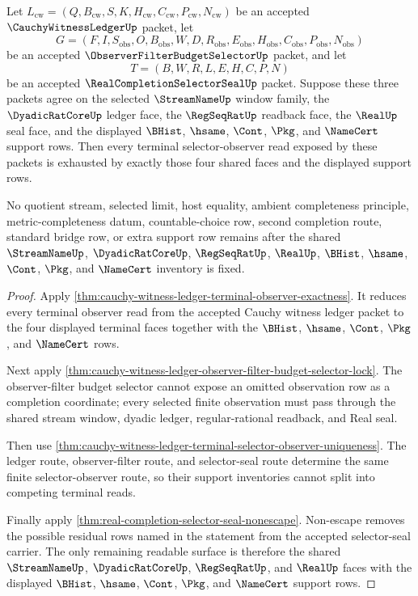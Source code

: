 \begin{theorem}
\label{thm:cauchy-witness-ledger-terminal-selector-observer-support-exhaustion}
Let $L_{\mathrm{cw}}=(Q,B_{\mathrm{cw}},S,K,H_{\mathrm{cw}},C_{\mathrm{cw}},P_{\mathrm{cw}},N_{\mathrm{cw}})$ be an accepted $\CauchyWitnessLedgerUp$ packet, let
$$
G=(F,I,S_{\mathrm{obs}},O,B_{\mathrm{obs}},W,D,R_{\mathrm{obs}},E_{\mathrm{obs}},H_{\mathrm{obs}},C_{\mathrm{obs}},P_{\mathrm{obs}},N_{\mathrm{obs}})
$$
be an accepted $\ObserverFilterBudgetSelectorUp$ packet, and let
$$
T=(B,W,R,L,E,H,C,P,N)
$$
be an accepted $\RealCompletionSelectorSealUp$ packet. Suppose these three packets agree on the selected $\StreamNameUp$ window family, the $\DyadicRatCoreUp$ ledger face, the $\RegSeqRatUp$ readback face, the $\RealUp$ seal face, and the displayed $\BHist$, $\hsame$, $\Cont$, $\Pkg$, and $\NameCert$ support rows. Then every terminal selector-observer read exposed by these packets is exhausted by exactly those four shared faces and the displayed support rows.

No quotient stream, selected limit, host equality, ambient completeness principle, metric-completeness datum, countable-choice row, second completion route, standard bridge row, or extra support row remains after the shared $\StreamNameUp$, $\DyadicRatCoreUp$, $\RegSeqRatUp$, $\RealUp$, $\BHist$, $\hsame$, $\Cont$, $\Pkg$, and $\NameCert$ inventory is fixed.
\end{theorem}
\begin{proof}
Apply \autoref{thm:cauchy-witness-ledger-terminal-observer-exactness}. It reduces every terminal observer read from the accepted Cauchy witness ledger packet to the four displayed terminal faces together with the $\BHist$, $\hsame$, $\Cont$, $\Pkg$, and $\NameCert$ rows.

Next apply \autoref{thm:cauchy-witness-ledger-observer-filter-budget-selector-lock}. The observer-filter budget selector cannot expose an omitted observation row as a completion coordinate; every selected finite observation must pass through the shared stream window, dyadic ledger, regular-rational readback, and Real seal.

Then use \autoref{thm:cauchy-witness-ledger-terminal-selector-observer-uniqueness}. The ledger route, observer-filter route, and selector-seal route determine the same finite selector-observer route, so their support inventories cannot split into competing terminal reads.

Finally apply \autoref{thm:real-completion-selector-seal-nonescape}. Non-escape removes the possible residual rows named in the statement from the accepted selector-seal carrier. The only remaining readable surface is therefore the shared $\StreamNameUp$, $\DyadicRatCoreUp$, $\RegSeqRatUp$, and $\RealUp$ faces with the displayed $\BHist$, $\hsame$, $\Cont$, $\Pkg$, and $\NameCert$ support rows.
\end{proof}

